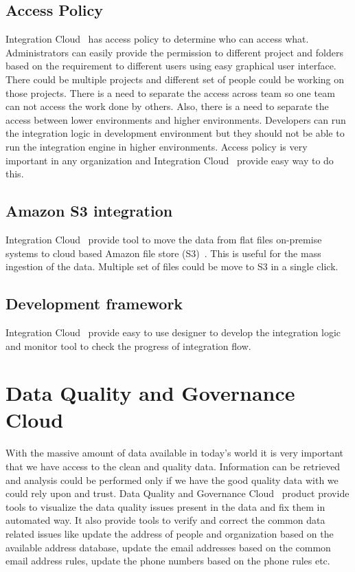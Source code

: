 \subsection{Access Policy}

Integration Cloud~\cite{hid-sp18-511-iics} has access policy to determine who can access what. Administrators can easily provide the permission to different project and folders based on the requirement to different users using easy graphical user interface. There could be multiple projects and different set of people could be working on those projects. There is a need to separate the access across team so one team can not access the work done by others. Also, there is a need to separate the access between lower environments and higher environments. Developers can run the integration logic in development environment but they should not be able to run the integration engine in higher environments. Access policy is very important in any organization and Integration Cloud~\cite{hid-sp18-511-iics} provide easy way to do this.

\subsection{Amazon S3 integration}

Integration Cloud~\cite{hid-sp18-511-iics} provide tool to move the data from flat files on-premise systems to cloud based Amazon file store (S3)~\cite{hid-sp18-511-aws-s3}. This is useful for the mass ingestion of the data. Multiple set of files could be move to S3 in a single click.

\subsection{Development framework}

Integration Cloud~\cite{hid-sp18-511-iics} provide easy to use designer to develop the integration logic and monitor tool to check the progress of integration flow.

\section{Data Quality and Governance Cloud}

With the massive amount of data available in today's world it is very
important that we have access to the clean and quality data. Information can be
retrieved and analysis could be performed only if we have the good
quality data with we could rely upon and trust. Data Quality and
Governance Cloud~\cite{hid-sp18-511-iics} product provide tools to
visualize the data quality issues present in the data and fix them in automated way. It
also provide tools to verify and correct the common data related
issues like update the address of people and organization based on the
available address database, update the email addresses based on the
common email address rules, update the phone numbers based on the phone rules etc.

